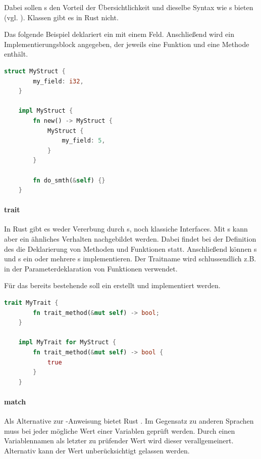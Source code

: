 \documentclass[11pt,a4paper, ngerman]{article}
\begin{document}
Dabei sollen s den Vorteil der Übersichtlichkeit und dieselbe Syntax wie s bieten (vgl. \cite[S. 91]{BO18}). Klassen gibt es in Rust nicht.

Das folgende Beispiel deklariert ein  mit einem Feld. Anschließend wird ein Implementierungsblock angegeben, der jeweils eine Funktion und eine Methode enthält.

\begin{lstlisting}[language=rust, caption={struct}]
    struct MyStruct {
        my_field: i32,
    }

    impl MyStruct {
        fn new() -> MyStruct {
            MyStruct {
                my_field: 5,
            }
        }

        fn do_smth(&self) {}
    }
\end{lstlisting}
\paragraph{trait} In Rust gibt es weder Vererbung durch s, noch klassiche Interfaces. Mit s kann aber ein ähnliches Verhalten nachgebildet werden. Dabei findet bei der Definition des  die Deklarierung von Methoden und Funktionen statt. Anschließend können s und s ein oder mehrere s implementieren. Der Traitname wird schlussendlich z.B. in der Parameterdeklaration von Funktionen verwendet.

Für das bereits bestehende  soll ein  erstellt und implementiert werden.

\begin{lstlisting}[language=rust, caption={trait}]
    trait MyTrait {
        fn trait_method(&mut self) -> bool;
    }

    impl MyTrait for MyStruct {
        fn trait_method(&mut self) -> bool {
            true
        }
    }
\end{lstlisting}
\paragraph{match} Als Alternative zur -Anweisung bietet Rust . Im Gegensatz zu anderen Sprachen muss bei  jeder mögliche Wert einer Variablen geprüft werden. Durch einen Variablennamen als letzter zu prüfender Wert wird dieser verallgemeinert. Alternativ kann der Wert unberücksichtigt gelassen werden.
\end{document}
